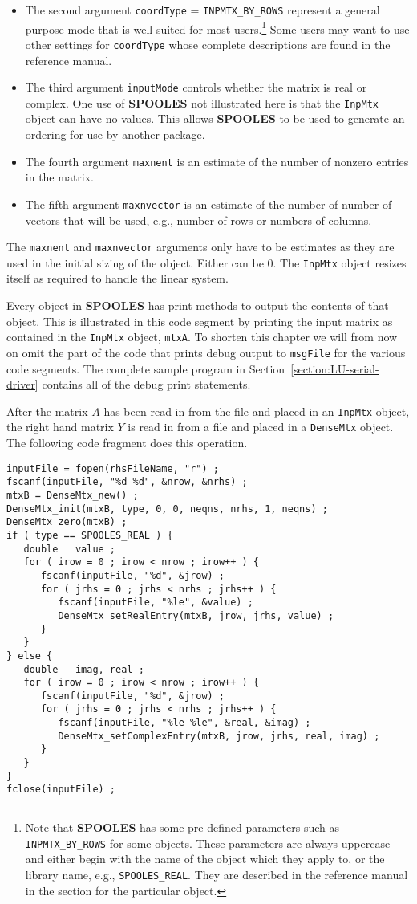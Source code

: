 \begin{itemize}
\item
The second argument {\tt coordType} = {\tt INPMTX\_BY\_ROWS}
represent a general purpose mode that is well suited
for most users.\footnote{Note that {\bf SPOOLES} has some
pre-defined parameters such as {\tt INPMTX\_BY\_ROWS} for some objects. 
These parameters are always uppercase and either begin with the name of 
the object which they apply to, or the library name, e.g.,
{\tt SPOOLES\_REAL}.
They are described in the reference manual in the section for the
particular object.}
Some users may want to use other settings for {\tt coordType}
whose complete descriptions are found in the reference
manual.
\item
The third argument {\tt inputMode} controls whether 
the matrix is real or complex.  
One use of {\bf SPOOLES} not illustrated here is that
the {\tt InpMtx} object can have no values.  
This allows {\bf SPOOLES}
to be used to generate an ordering for use by another package.
\item
The fourth argument {\tt maxnent} is an estimate of the number of
nonzero entries in the matrix.
\item
The fifth argument {\tt maxnvector} is an estimate of the number of
number of vectors that will be used, e.g., number of rows or
numbers of columns.
\end{itemize}
The {\tt maxnent} and {\tt maxnvector} arguments only
have to be estimates as they are used in the initial sizing of the
object.  
Either can be 0.  
The {\tt InpMtx} object resizes itself
as required to handle the linear system.
\par
Every object in {\bf SPOOLES} has print methods to output the
contents of that object.  This is illustrated in this code segment
by printing the input matrix as contained in the {\tt InpMtx} object,
{\tt mtxA}.
To shorten this chapter we will from now on omit the part of
the code that prints debug output to {\tt msgFile} for the various
code segments.  
The complete sample program in Section~\ref{section:LU-serial-driver}
contains all of the debug print statements.
\par
After the matrix $A$ has been read in from the file and placed in an
{\tt InpMtx} object, the right hand matrix $Y$ is read in from a
file and placed in a {\tt DenseMtx} object.
The following code fragment does this operation.
\begin{verbatim}
inputFile = fopen(rhsFileName, "r") ;
fscanf(inputFile, "%d %d", &nrow, &nrhs) ;
mtxB = DenseMtx_new() ;
DenseMtx_init(mtxB, type, 0, 0, neqns, nrhs, 1, neqns) ;
DenseMtx_zero(mtxB) ;
if ( type == SPOOLES_REAL ) {
   double   value ;
   for ( irow = 0 ; irow < nrow ; irow++ ) {
      fscanf(inputFile, "%d", &jrow) ;
      for ( jrhs = 0 ; jrhs < nrhs ; jrhs++ ) {
         fscanf(inputFile, "%le", &value) ;
         DenseMtx_setRealEntry(mtxB, jrow, jrhs, value) ;
      }
   }
} else {
   double   imag, real ;
   for ( irow = 0 ; irow < nrow ; irow++ ) {
      fscanf(inputFile, "%d", &jrow) ;
      for ( jrhs = 0 ; jrhs < nrhs ; jrhs++ ) {
         fscanf(inputFile, "%le %le", &real, &imag) ;
         DenseMtx_setComplexEntry(mtxB, jrow, jrhs, real, imag) ;
      }
   }
}
fclose(inputFile) ;
\end{verbatim}
